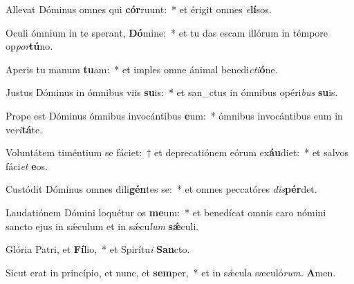 \item Allevat Dóminus omnes qui \textbf{cór}ruunt:~* et érigit omnes \textit{e}\textbf{lí}sos.
\item Oculi ó\-mnium in te sperant, \textbf{Dó}mine:~* et tu das escam illórum in témpore op\hspace*{0.01em}\textit{por}\textbf{tú}no.
\item Aperis tu manum \textbf{tu}am:~* et imples omne ánimal benedi\tinyhspace\textit{cti}\textbf{ó}ne.
\item Justus Dóminus in ómnibus viis \textbf{su}is:~* et san\_ctus in ómnibus opéri\textit{bus} \textbf{su}is.
\item Prope est Dóminus ómnibus invocántibus \textbf{e}um:~* ómnibus invocántibus eum in ve\tinyhspace\textit{ri}\textbf{tá}te.
\item Voluntátem timéntium se fáciet:~† et deprecatiónem eórum ex\textbf{áu}diet:~* et salvos fáci\tinyhspace\textit{et} \textbf{e}os.
\item Custódit Dóminus omnes dili\textbf{gén}tes se:~* et omnes peccatóres \textit{dis}\textbf{pér}det.
\item Laudatiónem Dómini loquétur os \textbf{me}um:~* et benedícat omnis caro nómini sancto ejus in sǽculum et in sǽcu\tinyhspace\textit{lum} \textbf{sǽ}culi.
\item Glória Patri, et \textbf{Fí}lio,~* et Spirítu\tinyhspace\textit{i} \textbf{San}cto.
\item Sicut erat in princípio, et nunc, et \textbf{sem}per,~* et in sǽcula sæculó\textit{rum.} \textbf{A}men.